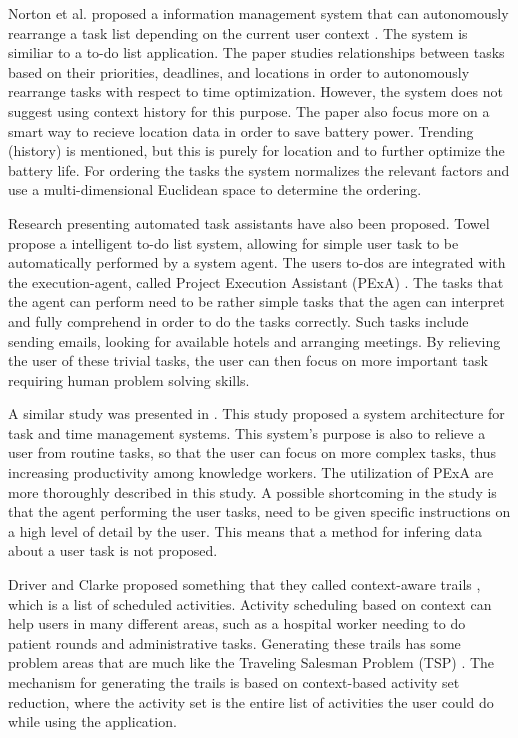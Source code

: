 Norton et al. proposed a information management system that can autonomously rearrange a task list depending on the current user context \cite{norton2010towards}. The system is similiar to a to-do list application. The paper studies relationships between tasks based on their priorities, deadlines, and locations in order to autonomously rearrange tasks with respect to time optimization. However, the system does not suggest using context history for this purpose. The paper also focus more on a smart way to recieve location data in order to save battery power. Trending (history) is mentioned, but this is purely for location and to further optimize the battery life. For ordering the tasks the system normalizes the relevant factors and use a multi-dimensional Euclidean space to determine the ordering.

Research presenting automated task assistants have also been proposed. Towel \cite{conley2007towel} propose a intelligent to-do list system, allowing for simple user task to be automatically performed by a system agent. The users to-dos are integrated with the execution-agent, called Project Execution Assistant (PExA) \cite{myers2005cognitive}. The tasks that the agent can perform need to be rather simple tasks that the agen can interpret and fully comprehend in order to do the tasks correctly. Such tasks include sending emails, looking for available hotels and arranging meetings. By relieving the user of these trivial tasks, the user can then focus on more important task requiring human problem solving skills.

A similar study was presented in \cite{myers2007intelligent}. This study proposed a system architecture for task and time management systems. This system's purpose is also to relieve a user from routine tasks, so that the user can focus on more complex tasks, thus increasing productivity among knowledge workers. The utilization of PExA are more thoroughly described in this study. A possible shortcoming in the study is that the agent performing the user tasks, need to be given specific instructions on a high level of detail by the user. This means that a method for infering data about a user task is not proposed.

Driver and Clarke proposed something that they called context-aware trails \cite{driver2008application}, which is a list of scheduled activities. Activity scheduling based on context can help users in many different areas, such as a hospital worker needing to do patient rounds and administrative tasks. Generating these trails has some problem areas that are much like the Traveling Salesman Problem (TSP) \cite{lawler1985traveling}. The mechanism for generating the trails is based on context-based activity set reduction, where the activity set is the entire list of activities the user could do while using the application.

